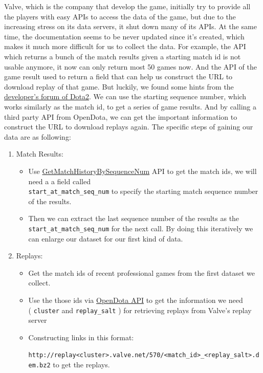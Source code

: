 \documentclass{article}
\newcommand{\codeinline}[1]{
	\texttt{#1}
}
\begin{document}
Valve, which is the company that develop the game, initially try to provide all the players with easy APIs to access the data of the game, but due to the increasing stress on its data servers, it shut down many of its APIs. At the same time, the documentation seems to be never updated since it's created, which makes it much more difficult for us to collect the data. For example, the API which returns a bunch of the match results given a starting match id is not usable anymore, it now can only return most 50 games now. And the API of the game result used to return a field that can help us construct the URL to download replay of that game. But luckily, we found some hints from the \href{https://dev.dota2.com}{developer's forum of Dota2}. We can use the starting sequence number, which works similarly as the match id, to get a series of game results. And by calling a third party API from OpenDota, we can get the important information to construct the URL to download replays again. The specific steps of gaining our data are as following:

\begin{enumerate}
\item Match Results:
	\begin{itemize}
		\item Use \href{https://wiki.teamfortress.com/wiki/WebAPI/GetMatchHistoryBySequenceNum}{GetMatchHistoryBySequenceNum} API to get the match ids, we will need a a field called \\ \codeinline{start_at_match_seq_num} to specify the starting match sequence number of the results.
		\item Then  we can extract the last sequence number of the results as the \codeinline{start_at_match_seq_num} for the next call. By doing this iteratively we can enlarge our dataset for our first kind of data.
	\end{itemize}
\item Replays:
	\begin{itemize}
		\item Get the match ids of recent professional games from the first dataset we collect.
		\item Use the those ids via \href{https://docs.opendota.com/#tag/matches}{OpenDota API} to get the information we need \\ (\codeinline{cluster} and \codeinline{replay_salt}) for retrieving replays from Valve's replay server
		\item Constructing links in this format:\\  \codeinline{ http://replay<cluster>.valve.net/570/<match_id>_<replay_salt>.dem.bz2} to get the replays.
	\end{itemize}
\end{enumerate}
\end{document}

